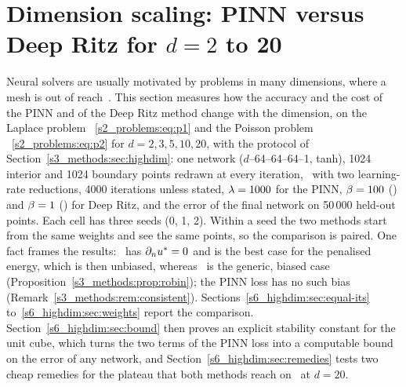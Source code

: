 %
\section{Dimension scaling: PINN versus Deep Ritz for \texorpdfstring{$d=2$}{d = 2} to 20}%
\label{s6_highdim:sec}

Neural solvers are usually motivated by problems in many dimensions, where a mesh is out
of reach~\citep{eyu2018,sirignano2018,han2018}. This section measures how the accuracy and
the cost of the PINN and of the Deep Ritz method change with the dimension, on the Laplace
problem \Pone~\eqref{s2_problems:eq:p1} and the Poisson problem \Ptwo~\eqref{s2_problems:eq:p2}
for $d=2,3,5,10,20$, with the protocol of Section~\ref{s3_methods:sec:highdim}: one network
($d$--64--64--64--1, tanh), 1024 interior and 1024 boundary points redrawn at every
iteration, \Adam\ with two learning-rate reductions, 4000 iterations unless stated,
$\lambda=1000$ for the PINN, $\beta=100$ (\Pone) and $\beta=1$ (\Ptwo) for Deep Ritz, and the
error of the final network on 50\,000 held-out points. Each cell has three seeds (0, 1, 2).
Within a seed the two methods start from the same weights and see the same points, so the
comparison is paired. One fact frames the results: \Ptwo\ has $\partial_nu^{*}=0$ and is the best
case for the penalised energy, which is then unbiased, whereas \Pone\ is the generic,
biased case (Proposition~\ref{s3_methods:prop:robin}); the PINN loss has no such bias
(Remark~\ref{s3_methods:rem:consistent}). Sections~\ref{s6_highdim:sec:equal-its}
to~\ref{s6_highdim:sec:weights} report the comparison. Section~\ref{s6_highdim:sec:bound} then
proves an explicit stability constant for the unit cube, which turns the two terms of the PINN
loss into a computable bound on the error of any network, and Section~\ref{s6_highdim:sec:remedies}
tests two cheap remedies for the plateau that both methods reach on \Ptwo\ at $d=20$.

